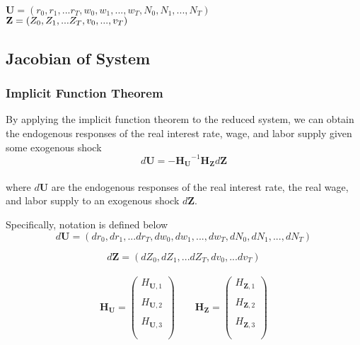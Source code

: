 \documentclass[titlepage]{\econtex}\providecommand{\texname}{BufferStockTheory}
\begin{document}
$\mathbf{U} = (r_{0} , r_{1} , ...r_{T}, w_{0}, w_{1}, ..., w_{T}, N_{0}, N_{1},...,N_{T})$ \\ 

$ \mathbf{Z} = ( Z_{0}, Z_{1},... Z_{T}, v_{0},...,v_{T}) \\ \\ $ 




\hypertarget{Jacobian of System}{}
\subsection{Jacobian of System} 

\hypertarget{Implicit Function Theorem}{}
\subsubsection{Implicit Function Theorem} 

By applying the implicit function theorem to the reduced system, we can obtain the endogenous responses of the real interest rate, wage, and labor supply given some exogenous shock \\

$$d\mathbf{U} =  -{\mathbf{H}_{\mathbf{U}}}^{-1} \mathbf{H}_{\mathbf{Z}} d \mathbf{Z}$$ \\ 

where $d\mathbf{U}$ are the endogenous responses of the real interest rate, the real wage, and labor supply to an exogenous shock $d \mathbf{Z}$.

Specifically, notation is defined below\\


$$d\mathbf{U} =(dr_{0} , dr_{1} , ...dr_{T}, dw_{0}, dw_{1}, ..., dw_{T}, dN_{0}, dN_{1},...,dN_{T})$$

$$d \mathbf{Z} = ( dZ_{0}, dZ_{1},... dZ_{T}, dv_{0},...dv_{T}) $$ \\





 $$  \mathbf{H}_{\mathbf{U}}= \begin{pmatrix} 
H_{\mathbf{U}, 1} \\ \\ 
H_{\mathbf{U}, 2}  \\ \\
H_{\mathbf{U}, 3} \\ \\
 \end{pmatrix} \quad \quad \mathbf{H}_{\mathbf{Z}}= \begin{pmatrix} 
H_{\mathbf{Z}, 1} \\ \\ 
H_{\mathbf{Z}, 2}  \\ \\
H_{\mathbf{Z}, 3} \\ \\
 \end{pmatrix}$$ \\ \\
 
\end{document}
